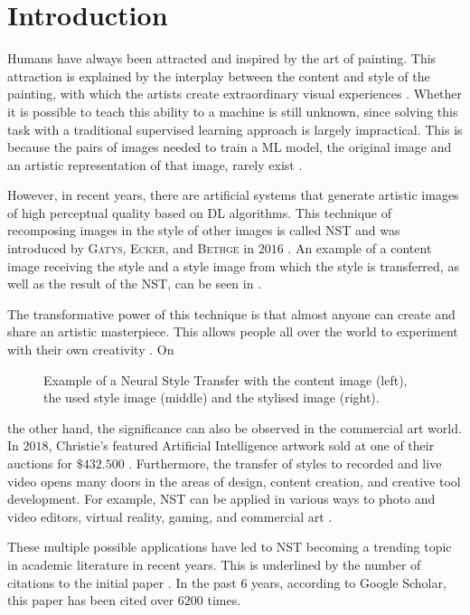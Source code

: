 \section{Introduction}
Humans have always been attracted and inspired by the art of painting. This attraction is explained by the interplay between the content and style of the painting, with which the artists create extraordinary visual experiences \cite{Glas2021}. Whether it is possible to teach this ability to a machine is still unknown, since solving this task with a traditional supervised learning approach is largely impractical. This is because the pairs of images needed to train a \gls{ML} model, the original image and an artistic representation of that image, rarely exist \cite{JAL2016}.
 
However, in recent years, there are artificial systems that generate artistic images of high perceptual quality based on \gls{DL} algorithms. This technique of recomposing images in the style of other images is called \gls{NST} and was introduced by \textsc{Gatys}, \textsc{Ecker}, and \textsc{Bethge} in $2016$ \cite{GEB2016}. An example of a content image receiving the style and a style image from which the style is transferred, as well as the result of the \gls{NST}, can be seen in . 

The transformative power of this technique is that almost anyone can create and share an artistic masterpiece. This allows people all over the world to experiment with their own creativity \cite{Kel2018}. On 
\begin{figure*}[h]
	\centering
	
	\caption{Example of a Neural Style Transfer with the content image \contentimage{} (left), the used style image \styleimage{} (middle) and the stylised image \image{} (right).}
	\label{fig:fig_nst}
\end{figure*}
the other hand, the significance can also be observed in the commercial art world. In $2018$, Christie's featured Artificial Intelligence artwork sold at one of their auctions for $\$432.500$ \cite{2018}. Furthermore, the transfer of styles to recorded and live video opens many doors in the areas of design, content creation, and creative tool development. For example, \gls{NST} can be applied in various ways to photo and video editors, virtual reality, gaming, and commercial art \cite{Glas2021, Ioa2021}.

These multiple possible applications have led to \gls{NST} becoming a trending topic in academic literature in recent years. This is underlined by the number of citations to the initial paper  \cite{GEB2016}. In the past $6$ years, according to Google Scholar, this paper has been cited over $6200$ times. 

